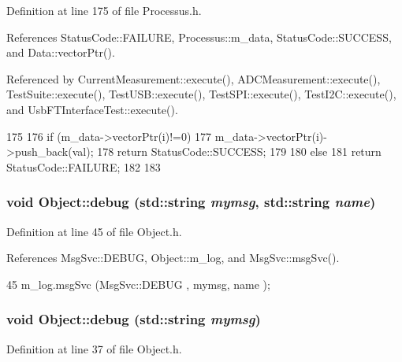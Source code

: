 Definition at line 175 of file Processus.h.

References StatusCode::FAILURE, Processus::m\_\-data, StatusCode::SUCCESS, and Data::vectorPtr().

Referenced by CurrentMeasurement::execute(), ADCMeasurement::execute(), TestSuite::execute(), TestUSB::execute(), TestSPI::execute(), TestI2C::execute(), and UsbFTInterfaceTest::execute().


\begin{DoxyCode}
175                                         {
176     if (m_data->vectorPtr(i)!=0){
177       m_data->vectorPtr(i)->push_back(val);
178       return StatusCode::SUCCESS;
179     }
180     else {
181       return StatusCode::FAILURE;
182     }
183   }
\end{DoxyCode}
\hypertarget{classObject_a6c9a0397ca804e04d675ed05683f5420}{
\subsubsection[{debug}]{\setlength{\rightskip}{0pt plus 5cm}void Object::debug (std::string {\em mymsg}, \/  std::string {\em name})}}
\label{classObject_a6c9a0397ca804e04d675ed05683f5420}


Definition at line 45 of file Object.h.

References MsgSvc::DEBUG, Object::m\_\-log, and MsgSvc::msgSvc().


\begin{DoxyCode}
45 { m_log.msgSvc (MsgSvc::DEBUG   , mymsg, name ); }
\end{DoxyCode}
\hypertarget{classObject_aac010553f022165573714b7014a15f0d}{
\subsubsection[{debug}]{\setlength{\rightskip}{0pt plus 5cm}void Object::debug (std::string {\em mymsg})}}
\label{classObject_aac010553f022165573714b7014a15f0d}


Definition at line 37 of file Object.h.

